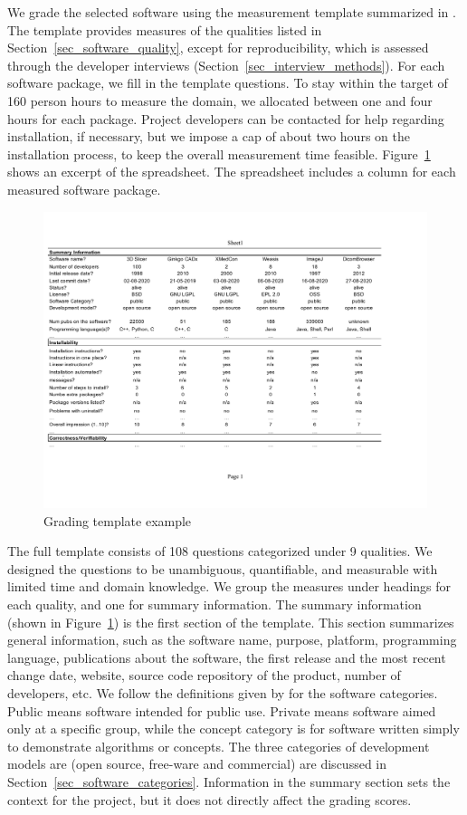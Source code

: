 \documentclass[11pt]{article}
\begin{document}
We grade the selected software using the measurement template summarized in
\citet{SmithEtAl2021}.  The template provides measures of the qualities listed
in Section~\ref{sec_software_quality}, except for reproducibility, which is
assessed through the developer interviews (Section~\ref{sec_interview_methods}).
For each software package, we fill in the template questions. To stay within the
target of 160 person hours to measure the domain, we allocated between one and
four hours for each package. Project developers can be contacted for help
regarding installation, if necessary, but we impose a cap of about two hours on
the installation process, to keep the overall measurement time feasible.
Figure~\ref{fg_grading_template_example} shows an excerpt of the spreadsheet.
The spreadsheet includes a column for each measured software package. 

\begin{figure}[!ht]
\includegraphics[scale=0.66]{template.pdf}
\caption{Grading template example}
\label{fg_grading_template_example}
\end{figure}

The full template consists of 108 questions categorized under 9 qualities.  We
designed the questions to be unambiguous, quantifiable, and measurable with
limited time and domain knowledge. We group the measures under headings for each
quality, and one for summary information. The summary information (shown in
Figure~\ref{fg_grading_template_example}) is the first section of the template.
This section summarizes general information, such as the software name, purpose,
platform, programming language, publications about the software, the first
release and the most recent change date, website, source code repository of the
product, number of developers, etc.  We follow the definitions given by
\citet{GewaltigAndCannon2012} for the software categories.  Public means
software intended for public use.  Private means software aimed only at a
specific group, while the concept category is for software written simply to
demonstrate algorithms or concepts. The three categories of development models
are (open source, free-ware and commercial) are discussed in
Section~\ref{sec_software_categories}.  Information in the summary section sets
the context for the project, but it does not directly affect the grading scores.
\end{document}
